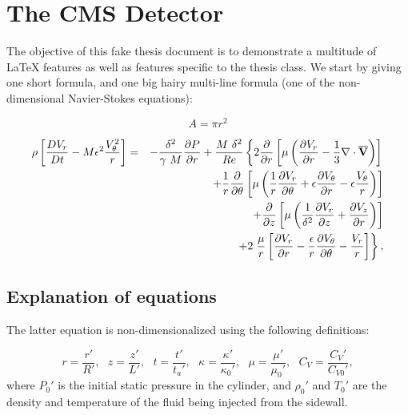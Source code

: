 \chapter{The CMS Detector}
\label{mathchapter}

The objective of this fake thesis document is to demonstrate
a multitude of \LaTeX{} features as well as features specific
to the thesis class.
We start by giving one short formula,
and one big hairy multi-line formula
(one of the non-dimensional Navier-Stokes equations):

\begin{equation}
	A = \pi r^2
\end{equation}


\begin{eqnarray}
  \rho \left[ \frac{DV_r}{Dt} - M \epsilon^2
    \frac{V_{\theta}^2}{r} \right]
  & = & -\frac{\delta^2}{\gamma~ M} \frac{\partial P}{\partial r}
	+ \frac{M ~\delta^2}{Re} \left\{ 2 \frac{\partial }{\partial r}
	\left[ \mu \left( \frac{\partial V_r}{\partial r}
        - \frac{1}{3} {\bf \nabla \cdot \overline{V}}
      \right) \right] \right. \nonumber \\
  & & + \frac{1}{r} \frac{\partial }{\partial \theta} \left[ \mu \left(
      \frac{1}{r} \frac{\partial V_r}{\partial \theta} + \epsilon \frac{\partial V_{\theta}}{\partial r}
      - \epsilon \frac{V_{\theta}}{r} \right) \right] \nonumber \\
  & & + \frac{\partial }{\partial z} \left[ \mu \left( \frac{1}{\delta^2}
        \frac{\partial V_r}{\partial z} + \frac{\partial V_z}{\partial r} \right) \right] \nonumber \\
  & & + 2 \left. \frac{\mu}{r}\left[ \frac{\partial V_r}{\partial r} -\frac{\epsilon}{r}
      \frac{\partial V_{\theta}}{\partial \theta} - \frac{V_r}r\right] \right\}, \label{eq:rmom}
\end{eqnarray}


\section{Explanation of equations}

The latter equation is non-dimensionalized using the following definitions:

\[
	r = \frac{r'}{R'}, ~~~
	z = \frac{z'}{L'},~~~
	t = \frac{t'}{t_a'}, ~~~
	\kappa = \frac{\kappa'}{\kappa_0'}, ~~~
	\mu = \frac{\mu'}{\mu_0'} , ~~~
	C_V = \frac{C_V'}{C_{V0}'},
\]
where $P_0'$ is the initial static pressure in the cylinder,
and $\rho_0'$ and $T_0'$ are the density and temperature
of the fluid being injected from the sidewall.

